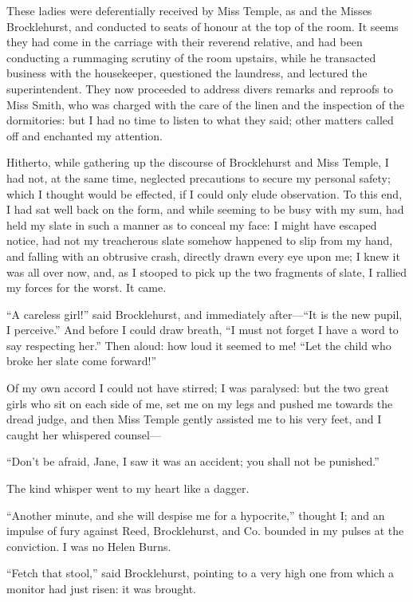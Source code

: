 These ladies were deferentially received by Miss Temple, as \Mrs{} and the
Misses Brocklehurst, and conducted to seats of honour at the top of the
room. It seems they had come in the carriage with their reverend
relative, and had been conducting a rummaging scrutiny of the room
upstairs, while he transacted business with the housekeeper, questioned
the laundress, and lectured the superintendent. They now proceeded to
address divers remarks and reproofs to Miss Smith, who was charged with
the care of the linen and the inspection of the dormitories: but I had
no time to listen to what they said; other matters called off and
enchanted my attention.

Hitherto, while gathering up the discourse of \Mr{} Brocklehurst and Miss
Temple, I had not, at the same time, neglected precautions to secure my
personal safety; which I thought would be effected, if I could only
elude observation. To this end, I had sat well back on the form, and
while seeming to be busy with my sum, had held my slate in such a manner
as to conceal my face: I might have escaped notice, had not my
treacherous slate somehow happened to slip from my hand, and falling
with an obtrusive crash, directly drawn every eye upon me; I knew it was
all over now, and, as I stooped to pick up the two fragments of slate, I
rallied my forces for the worst. It came.

\enquote{A careless girl!} said \Mr{} Brocklehurst, and immediately
after---\enquote{It is the new pupil, I perceive.} And before I could
draw breath, \enquote{I must not forget I have a word to say respecting
her.} Then aloud: how loud it seemed to me! \enquote{Let the child who
broke her slate come forward!}

Of my own accord I could not have stirred; I was paralysed: but the two
great girls who sit on each side of me, set me on my legs and pushed me
towards the dread judge, and then Miss Temple gently assisted me to his
very feet, and I caught her whispered counsel---

\enquote{Don't be afraid, Jane, I saw it was an accident; you shall not
be punished.}

The kind whisper went to my heart like a dagger.

\enquote{Another minute, and she will despise me for a hypocrite,}
thought I; and an impulse of fury against Reed, Brocklehurst, and Co.
bounded in my pulses at the conviction. I was no Helen Burns.

\enquote{Fetch that stool,} said \Mr{} Brocklehurst, pointing to a very
high one from which a monitor had just risen: it was brought.

